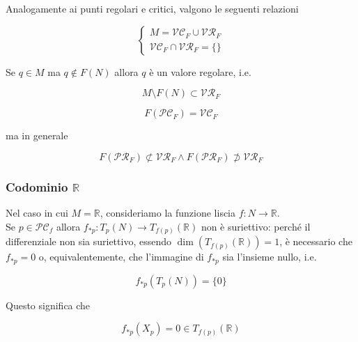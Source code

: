 Analogamente ai punti regolari e critici, valgono le seguenti relazioni

\begin{equation}
	\begin{cases}
		M = \mathcal{VC}_{F} \cup \mathcal{VR}_{F}\\
		\mathcal{VC}_{F} \cap \mathcal{VR}_{F} = \{\}
	\end{cases}
\end{equation}

\begin{remark}
	Se $ q \in M $ ma $ q \notin F(N) $ allora $ q $ è un valore regolare, i.e.
	
	\begin{equation}
		M \setminus F(N) \subset \mathcal{VR}_{F}
	\end{equation}
\end{remark}

\begin{remark}
	\begin{equation}
		F(\mathcal{PC}_{F}) = \mathcal{VC}_{F}
	\end{equation}

	ma in generale
	
	\begin{equation}
		F(\mathcal{PR}_{F}) \not\subset \mathcal{VR}_{F} \wedge F(\mathcal{PR}_{F}) \not\supset \mathcal{VR}_{F}
	\end{equation}
\end{remark}

\subsubsection{Codominio $ \mathbb{R} $}

Nel caso in cui $ M = \mathbb{R} $, consideriamo la funzione liscia $ f : N \to \mathbb{R} $.\\
Se $ p \in \mathcal{PC}_{f} $ allora $ f_{*p} : T_{p}(N) \to T_{f(p)}(\mathbb{R}) $ non è suriettivo: perché il differenziale non sia suriettivo, essendo $ \dim(T_{f(p)}(\mathbb{R})) = 1 $, è necessario che $ f_{*p} = 0 $ o, equivalentemente, che l'immagine di $ f_{*p} $ sia l'insieme nullo, i.e.

\begin{equation}
	f_{*p}(T_{p}(N)) = \{0\}
\end{equation}

Questo significa che

\begin{equation}
	f_{*p}(X_{p}) = 0 \in T_{f(p)}(\mathbb{R})
\end{equation}

